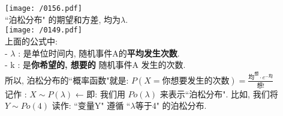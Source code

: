 \documentclass[UTF8]{ctexart}
\begin{document}
	\texttt{[image: /0156.pdf]} \\
	
	``泊松分布" 的期望和方差, 均为$\lambda$. \\
	
	
	
	\texttt{[image: /0149.pdf]} \\
	上面的公式中:  \\
	- $\lambda$ : 是单位时间内, 随机事件A的\textbf{平均发生次数}. \\
	- k : 是\textbf{你希望的, 想要的} 随机事件A 发生的次数. \\
	
	
	所以, 泊松分布的``概率函数"就是: $\boxed{
		P\left(X=\text{你想要发生的次数} \right) =\frac{\text{均}^{\text{想}}\cdot e^{-\text{均}}}{\text{想!}}
	}$ \\

	记作 : $\boxed{	X \sim P(\lambda)}$	← 	即: 我们用 $Po(\lambda)$ 来表示``泊松分布". 比如, 我们将$ Y \sim Po(4)$ 读作: ``变量Y" 遵循 ``$\lambda$等于4" 的泊松分布. \\

	
	
\end{document}
